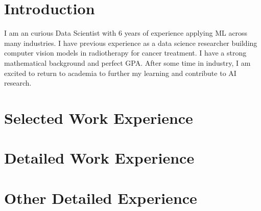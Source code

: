 \documentclass[11pt,a4paper]{moderncv}
\begin{document}
\makecvtitle

\section*{Introduction}
I am an curious Data Scientist with 6 years of experience applying ML across many industries. I have previous experience as a data science researcher building computer vision models in radiotherapy for cancer treatment. I have a strong mathematical background and perfect GPA. After some time in industry, I am excited to return to academia to further my learning and contribute to AI research.



\section{Selected Work Experience}







\newpage
\section{Detailed Work Experience}





\section{Other Detailed Experience}

\end{document}
